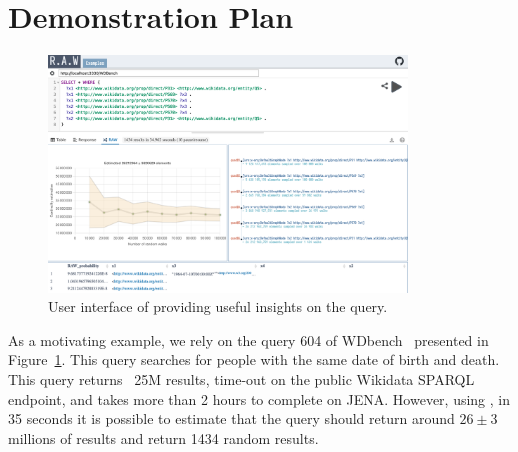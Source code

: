 




\section{Demonstration Plan}

 \begin{figure}
   \centering
   \includegraphics[width=0.85\textwidth]{figures/raw_screenshot.png}
   \caption{\label{fig:raw_screenshot}User interface of \NAME providing useful insights on the query.}
 \end{figure}


 As a motivating example, we rely on the query 604 of
 WDbench~\cite{angles2022wdbench} presented in
 Figure~\ref{fig:raw_screenshot}. This query searches for people
 with the same date of birth and death. This query returns ~25M results,
 time-out on the public Wikidata SPARQL endpoint, and takes more than
 2 hours to complete on JENA. However, using \NAME, in 35 seconds it
 is possible to estimate that the query should return around $26 \pm 3$ 
 millions of results and return 1434 random results.

